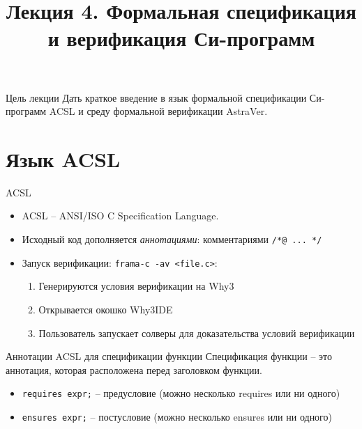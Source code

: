 \documentclass[hyperref={unicode=true}]{beamer}
\title{Лекция 4. Формальная спецификация и верификация Си-программ}
\author{}
\date{}
\begin{document}
	\begin{frame}{}
		\titlepage
	\end{frame}

    \begin{frame}{Цель лекции}
    Дать краткое введение в язык формальной спецификации
    Си-программ ACSL и среду формальной верификации AstraVer.
    \end{frame}


    \section{Язык ACSL}


    \begin{frame}[fragile]{ACSL}
    \begin{itemize}
    \item
    ACSL -- ANSI/ISO C Specification Language.
    \item
    Исходный код дополняется \emph{аннотациями}:
    комментариями \verb|/*@ ... */|
    \item
    Запуск верификации: \verb|frama-c -av <file.c>|:
        \begin{enumerate}
        \item
        Генерируются условия верификации на Why3
        \item
        Открывается окошко Why3IDE
        \item
        Пользователь запускает солверы для доказательства условий верификации
        \end{enumerate}
    \end{itemize}
    \end{frame}


    \begin{frame}[fragile]{Аннотации ACSL для спецификации функции}
    Спецификация функции -- это аннотация, которая
    расположена перед заголовком функции.
    \begin{itemize}
    \item
    \verb|requires expr;| -- предусловие
    (можно несколько requires или ни одного)
    \item
    \verb|ensures expr;| -- постусловие
    (можно несколько ensures или ни одного)
    \end{itemize}
    \end{frame}
\end{document}
